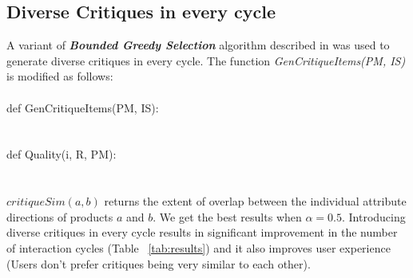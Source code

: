 \documentclass[10pt]{article}
\begin{document}
\subsection{Diverse Critiques in every cycle}
A variant of \textit{\textbf{Bounded Greedy Selection}} algorithm described in \cite{mcginty} was used to generate diverse critiques in every cycle.
The function \textit{GenCritiqueItems(PM, IS)} is modified as follows:\\
\\
def GenCritiqueItems(PM, IS):\\
\noindent{}
\\
\\
def Quality(i, R, PM):\\
\noindent{}
\\
\\
$critiqueSim(a, b)$ returns the extent of overlap between the individual attribute directions of products $a$ and $b$.
We get the best results when $\alpha = 0.5$.
Introducing diverse critiques in every cycle results in significant improvement in the number of interaction cycles (Table ~\ref{tab:results}) and it also improves user experience (Users don't prefer critiques being very similar to each other).
\end{document}
